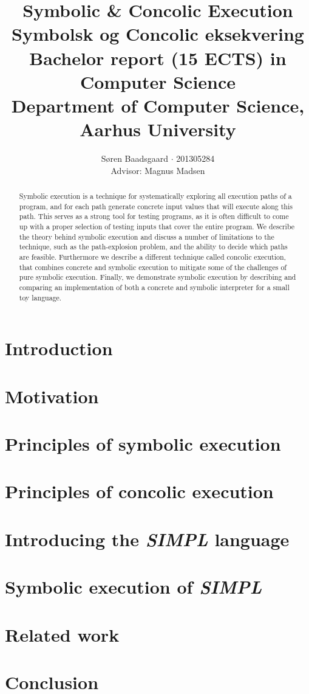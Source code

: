\documentclass[]{report}
\title{
	\textbf{Symbolic \& Concolic Execution}\\
	{ Symbolsk og Concolic eksekvering}\\
	\bigskip
	\large Bachelor report (15 ECTS) in Computer Science\\
	 Department of Computer Science, Aarhus University
	}
\author{Søren Baadsgaard $\cdot$ 201305284 \\
	Advisor: Magnus Madsen}
\newcommand{\explanguage}{\textsl{SIMPL }}
\begin{document}
\maketitle

\begin{abstract}
	Symbolic execution is a technique for systematically exploring all execution paths of a program, and for each path generate concrete input values that will execute along this path. This serves as a strong tool for testing programs, as it is often difficult to come up with a proper selection of testing inputs that cover the entire program. We describe the theory behind symbolic execution and discuss a number of limitations to the technique, such as the path-explosion problem, and the ability to decide which paths are feasible. Furthermore we describe a different technique called concolic execution, that combines concrete and symbolic execution to mitigate some of the challenges of pure symbolic execution. Finally, we demonstrate symbolic execution by describing and comparing an implementation of both a concrete and symbolic interpreter for a small toy language. 
\end{abstract}

\tableofcontents

\chapter{Introduction}
	
	
\chapter{Motivation}
	
\chapter{Principles of symbolic execution}
	
\chapter{Principles of concolic execution}
	
\chapter{Introducing the \explanguage language}
	
\chapter{Symbolic execution of \explanguage}
	
\chapter{Related work}
	
\chapter{Conclusion}
	

\appendix



\end{document}
